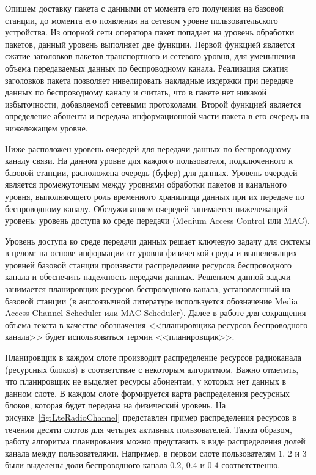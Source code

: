 Опишем доставку пакета с данными от момента его получения на базовой станции, до момента его появления на сетевом уровне пользовательского устройства. Из опорной сети оператора пакет попадает на уровень обработки пакетов, данный уровень выполняет две функции. Первой функцией является сжатие заголовков пакетов транспортного и сетевого уровня, для уменьшения объема передаваемых данных по беспроводному канала. Реализация сжатия заголовков пакета позволяет нивелировать накладные издержки при передаче данных по беспроводному каналу и считать, что в пакете нет никакой избыточности, добавляемой сетевыми протоколами. Второй функцией является определение абонента и передача информационной части пакета в его очередь на нижележащем уровне.

Ниже расположен уровень очередей для передачи данных по беспроводному каналу связи. На данном уровне для каждого пользователя, подключенного к базовой станции, расположена очередь (буфер) для данных. Уровень очередей является промежуточным между уровнями обработки пакетов и канального уровня, выполняющего роль временного хранилища данных при их передаче по беспроводному каналу. Обслуживанием очередей занимается нижележащий уровень: уровень доступа ко среде передачи (Medium Access Control или MAC).

Уровень доступа ко среде передачи данных решает ключевую задачу для системы в целом: на основе информации от уровня физической среды и вышележащих уровней базовой станции произвести распределение ресурсов беспроводного канала и обеспечить надежность передачи данных. Решением данной задачи занимается планировщик ресурсов беспроводного канала, установленный на базовой станции (в англоязычной литературе используется обозначение Media Access Channel Scheduler или MAC Scheduler). Далее в работе для сокращения объема текста в качестве обозначения <<планировщика ресурсов беспроводного канала>> будет использоваться термин <<планировщик>>.

Планировщик в каждом слоте производит распределение ресурсов радиоканала (ресурсных блоков) в соответствие с некоторым алгоритмом. Важно отметить, что планировщик не выделяет ресурсы абонентам, у которых нет данных в данном слоте. В каждом слоте формируется карта распределения ресурсных блоков, которая будет передана на физический уровень. На рисунке~\ref{fig:LteRadioChannel} представлен пример распределения ресурсов в течении десяти слотов для четырех активных пользователей. Таким образом, работу алгоритма планирования можно представить в виде распределения долей канала между пользователями. Например, в первом слоте пользователям $1$, $2$ и $3$ были выделены доли беспроводного канала $0.2$, $0.4$ и $0.4$ соответственно.

